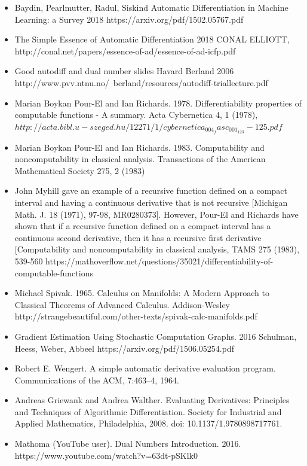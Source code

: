 \documentclass[11pt]{article}
\theoremstyle{definition}
\theoremstyle{plain}
\begin{document}
\begin{itemize}
    
    \item  Baydin, Pearlmutter, Radul, Siskind
    Automatic Differentiation
    in Machine Learning: a Survey 2018
    https://arxiv.org/pdf/1502.05767.pdf

    \item The Simple Essence of Automatic Differentiation 2018
    CONAL ELLIOTT, http://conal.net/papers/essence-of-ad/essence-of-ad-icfp.pdf

    \item Good autodiff and dual number slides
    Havard Berland 2006
    http://www.pvv.ntnu.no/~berland/resources/autodiff-triallecture.pdf

    \item Marian Boykan Pour-El and Ian Richards. 1978. 
    Differentiability properties of computable functions - A summary. 
    Acta Cybernetica 4, 1 (1978), 
    $http://acta.bibl.u-szeged.hu/12271/1/cybernetica_004_fasc_001_123-125.pdf$

    \item Marian Boykan Pour-El and Ian Richards. 1983. 
    Computability and noncomputability in classical analysis. Transactions of
    the American Mathematical Society 275, 2 (1983)

    \item John Myhill gave an example of a recursive function defined on a 
    compact interval and having a continuous derivative that is not recursive 
    [Michigan Math. J. 18 (1971), 97-98, MR0280373]. However, Pour-El and Richards 
    have shown that if a recursive function defined on a compact interval has a 
    continuous second derivative, then it has a recursive first derivative 
    [Computability and noncomputability in classical analysis, TAMS 275 (1983), 539-560
    https://mathoverflow.net/questions/35021/differentiability-of-computable-functions

    \item Michael Spivak. 1965. Calculus on Manifolds: A Modern Approach to 
    Classical Theorems of Advanced Calculus. Addison-Wesley
    http://strangebeautiful.com/other-texts/spivak-calc-manifolds.pdf

    \item Gradient Estimation Using Stochastic Computation Graphs. 2016
    Schulman, Heess, Weber, Abbeel
    https://arxiv.org/pdf/1506.05254.pdf

    \item Robert E. Wengert. A simple automatic derivative evaluation program. 
    Communications of the ACM, 7:463–4, 1964.

    \item Andreas Griewank and Andrea Walther. Evaluating Derivatives: Principles and Techniques
of Algorithmic Differentiation. Society for Industrial and Applied Mathematics, Philadelphia, 2008. doi: 10.1137/1.9780898717761.

    \item Mathoma (YouTube user). Dual Numbers Introduction. 2016.
    https://www.youtube.com/watch?v=63dt-pSKlk0 


\end{itemize}
\end{document}
